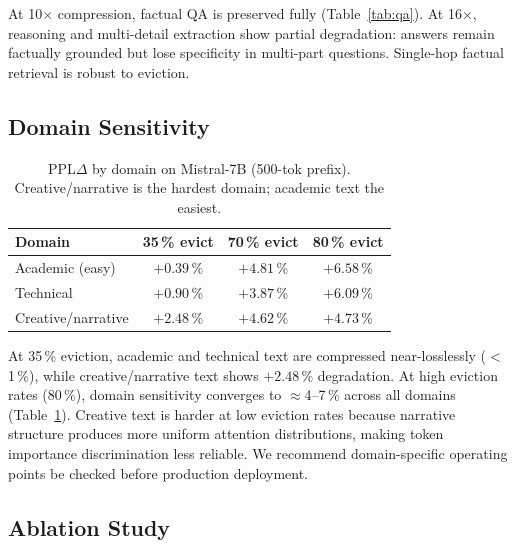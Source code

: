 \documentclass{article}
\begin{document}
At 10$\times$ compression, factual QA is preserved fully (Table~\ref{tab:qa}).
At 16$\times$, reasoning and multi-detail extraction show partial degradation:
answers remain factually grounded but lose specificity in multi-part questions.
Single-hop factual retrieval is robust to eviction.

\subsection{Domain Sensitivity}
\label{sec:domain}

\begin{table}[t]
\centering
\caption{PPL$\Delta$ by domain on Mistral-7B (500-tok prefix). Creative/narrative
  is the hardest domain; academic text the easiest.}
\label{tab:domain}
\begin{tabular}{@{}lccc@{}}
\toprule
Domain & 35\,\% evict & 70\,\% evict & 80\,\% evict \\
\midrule
Academic (easy) & $+0.39$\,\% & $+4.81$\,\% & $+6.58$\,\% \\
Technical       & $+0.90$\,\% & $+3.87$\,\% & $+6.09$\,\% \\
Creative/narrative & $+2.48$\,\% & $+4.62$\,\% & $+4.73$\,\% \\
\bottomrule
\end{tabular}
\end{table}

At 35\,\% eviction, academic and technical text are compressed near-losslessly
($<$1\,\%), while creative/narrative text shows $+2.48$\,\% degradation.
At high eviction rates (80\,\%), domain sensitivity converges to $\approx$4--7\,\%
across all domains (Table~\ref{tab:domain}). Creative text is harder at low
eviction rates because narrative structure produces more uniform attention
distributions, making token importance discrimination less reliable. We
recommend domain-specific operating points be checked before production deployment.

\subsection{Ablation Study}
\label{sec:ablation}
\end{document}
